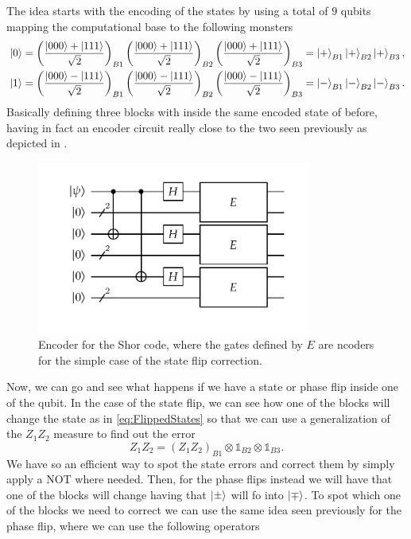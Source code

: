 The idea starts with the encoding of the states by using a total of $9$ qubits mapping the computational base to the following monsters
\begin{align}
    &\ket{0} = \left( \frac{\ket{000} + \ket{111}}{\sqrt{2}} \right)_{B1}\left( \frac{\ket{000} + \ket{111}}{\sqrt{2}} \right)_{B2}\left( \frac{\ket{000} + \ket{111}}{\sqrt{2}} \right)_{B3} = \ket{+}_{B1}\ket{+}_{B2}\ket{+}_{B3},\\
    &\ket{1} = \left( \frac{\ket{000} - \ket{111}}{\sqrt{2}} \right)_{B1}\left( \frac{\ket{000} - \ket{111}}{\sqrt{2}} \right)_{B2}\left( \frac{\ket{000} - \ket{111}}{\sqrt{2}} \right)_{B3} = \ket{-}_{B1}\ket{-}_{B2}\ket{-}_{B3}.
\end{align}
Basically defining three blocks with inside the same encoded state of before, having in fact an encoder circuit really close to the two seen previously as depicted in .
\begin{figure}[t]
    \centering
    \includegraphics[width=0.8\textwidth]{Immagini/ShorEncoder.pdf}
    \caption{
        Encoder for the Shor code, where the gates defined by $E$ are ncoders for the simple case of the state flip correction.
    }
    \label{fig:ShorEncoder}
\end{figure}
Now, we can go and see what happens if we have a state or phase flip inside one of the qubit. In the case of the state flip, we can see how one of the blocks will change the state as in \eqref{eq:FlippedStates} so that we can use a generalization of the $Z_1Z_2$ measure to find out the error
\begin{equation}
    Z_1Z_2 = (Z_1Z_2)_{B1}\otimes\mathbb{1}_{B2}\otimes\mathbb{1}_{B3}.
\end{equation}
We have so an efficient way to spot the state errors and correct them by simply apply a NOT where needed. Then, for the phase flips instead we will have that one of the blocks will change having that $\ket{\pm}$ will fo into $\ket{\mp}$. To spot which one of the blocks we need to correct we can use the same idea seen previously for the phase flip, where we can use the following operators

